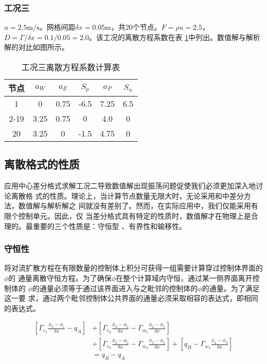 \subsubsection{工况三}
$u=2.5\mathrm{m/s}$。网格间距$\delta x=0.05\mathrm{m}$，共20个节点。$F=\rho
u=2.5$，$D=\Gamma/\delta x=0.1/0.05=2.0$。该工况的离散方程系数在表
\ref{TbFV_cd_cd_coeff_value3}中列出。数值解与解析解的对比如图所示。
\begin{table}[H]
  \begin{center}
  \caption{工况三离散方程系数计算表}
  \label{TbFV_cd_cd_coeff_value3}
  \begin{tabular}{|c|c|c|c|c|c|}
    \hline
    节点 & $a_{W}$ & $a_{E}$ & $S_{p}$ & $a_{P}$ & $S_{u}$ \\
    \hline
    1 & 0 & 0.75 & -6.5 &   7.25   &  6.5\\
    \hline
    2-19 & 3.25 & 0.75 & 0 & 4.0 & 0 \\
    \hline
    20 & 3.25 & 0 & -1.5 & 4.75 &  0 \\
    \hline
  \end{tabular}
  \end{center}
\end{table}

\subsection{离散格式的性质}
应用中心差分格式求解工况二导致数值解出现振荡问题促使我们必须更加深入地讨论离散格
式的性质。理论上，当计算节点数量无限大时，无论采用和中差分方法，数值解与解析解之
间就没有差别了。然而，在实际应用中，我们仅能采用有限个控制单元。因此，仅
当差分格式具有特定的性质时，数值解才在物理上是合理的。最重要的三个性质是：守恒型
、有界性和输移性。
\subsubsection{守恒性}
将对流扩散方程在有限数量的控制体上积分可获得一组需要计算穿过控制体界面的$\phi$的
通量离散守恒方程。为了确保$\phi$在整个计算域内守恒，通过某一侧界面离开控制体的
$\phi$的通量必须等于通过该界面进入与之毗邻的控制体的$\phi$的通量。为了满足这一要
求，通过两个毗邻控制体公共界面的通量必须采取相容的表达式，即相同的表达式。

\begin{equation}
  \begin{aligned}
  \left[
    \Gamma_{e_{1}}\frac{\phi_{2}-\phi_{1}}{\delta x} - q_{A}
  \right]
  &+
  \left[
    \Gamma_{e_{2}}\frac{\phi_{3}-\phi_{2}}{\delta x}  
    -
    \Gamma_{w_{2}}\frac{\phi_{2}-\phi_{1}}{\delta x}  
  \right]
  \\
  &+
  \left[
    \Gamma_{e_{3}}\frac{\phi_{4}-\phi_{3}}{\delta x}  
    -
    \Gamma_{w_{3}}\frac{\phi_{3}-\phi_{2}}{\delta x}  
  \right]
  +
  \left[
    q_{B} - \Gamma_{w_{4}}\frac{\phi_{4}-\phi_{3}}{\delta x}
  \right]
  \\
  &=
  q_{B} - q_{A}
  \end{aligned}
\end{equation}

